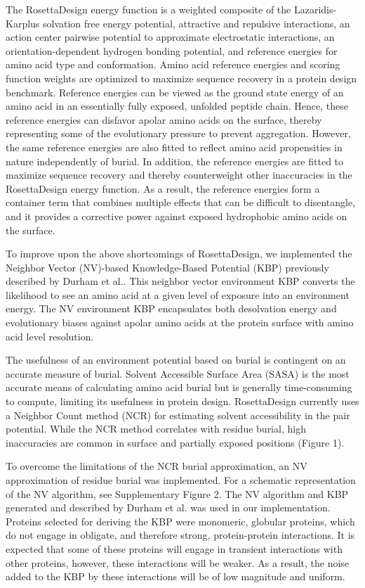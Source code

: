 The RosettaDesign energy function is a weighted composite of the Lazaridis-Karplus solvation free energy potential, attractive and repulsive interactions, an action center pairwise potential to approximate electrostatic interactions, an orientation-dependent hydrogen bonding potential\citep{Kortemme:2003td}, and reference energies for amino acid type and conformation\citep{Dantas:2003vt}. 
Amino acid reference energies and scoring function weights are optimized to maximize sequence recovery in a protein design benchmark.
Reference energies can be viewed as the ground state energy of an amino acid in an essentially fully exposed, unfolded peptide chain.
Hence, these reference energies can disfavor apolar amino acids on the surface, thereby representing some of the evolutionary pressure to prevent aggregation.
However, the same reference energies are also fitted to reflect amino acid propensities in nature independently of burial.
In addition, the reference energies are fitted to maximize sequence recovery and thereby counterweight other inaccuracies in the RosettaDesign energy function.
As a result, the reference energies form a container term that combines multiple effects that can be difficult to disentangle, and it provides a corrective power against exposed hydrophobic amino acids on the surface.

To improve upon the above shortcomings of RosettaDesign, we implemented the Neighbor Vector (NV)-based Knowledge-Based Potential (KBP) previously described by Durham et al.\citep{Durham:2009kt}.
This neighbor vector environment KBP converts the likelihood to see an amino acid at a given level of exposure into an environment energy.
The NV environment KBP encapsulates both desolvation energy and evolutionary biases against apolar amino acids at the protein surface with amino acid level resolution.

The usefulness of an environment potential based on burial is contingent on an accurate measure of burial.
Solvent Accessible Surface Area (SASA) is the most accurate means of calculating amino acid burial but is generally time-consuming to compute, limiting its usefulness in protein design.
RosettaDesign currently uses a Neighbor Count method (NCR) for estimating solvent accessibility in the pair potential.
While the NCR method correlates with residue burial, high inaccuracies are common in surface and partially exposed positions (Figure 1). 

To overcome the limitations of the NCR burial approximation, an NV approximation of residue burial was implemented.
For a schematic representation of the NV algorithm, see Supplementary Figure 2.
The NV algorithm and KBP generated and described by Durham et al\citep{Durham:2009kt}.
was used in our implementation.
Proteins selected for deriving the KBP were monomeric, globular proteins, which do not engage in obligate, and therefore strong, protein-protein interactions.
It is expected that some of these proteins will engage in transient interactions with other proteins, however, these interactions will be weaker.
As a result, the noise added to the KBP by these interactions will be of low magnitude and uniform.

